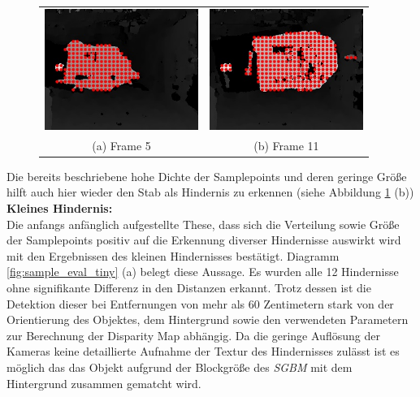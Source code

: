 \begin{figure}[h]
	\centering
	\begin{tabular}{cc}
	\includegraphics[width=5cm]{img/evaluation/sample_tiny_test_5_disparity}&
	\includegraphics[width=5cm]{img/evaluation/sample_tiny_test_11_disparity}\\
	(a) Frame 5 &  (b) Frame 11
	\end{tabular}
	\caption{}
	\label{fig:sample_eval_medium_fails}
\end{figure}

\noindent
Die bereits beschriebene hohe Dichte der Samplepoints und deren geringe Größe hilft auch hier wieder den Stab als Hindernis zu erkennen (siehe Abbildung \ref{fig:sample_eval_medium_fails} (b))\\


\noindent
\textbf{Kleines Hindernis:}\\
Die anfangs anfänglich aufgestellte These, dass sich die Verteilung sowie Größe der Samplepoints positiv auf die Erkennung diverser Hindernisse auswirkt wird mit den Ergebnissen des kleinen Hindernisses bestätigt. Diagramm \ref{fig:sample_eval_tiny} (a) belegt diese Aussage. Es wurden alle 12 Hindernisse ohne signifikante Differenz in den Distanzen erkannt. Trotz dessen ist die Detektion dieser bei Entfernungen von mehr als 60 Zentimetern stark von der Orientierung des Objektes, dem Hintergrund sowie den verwendeten Parametern zur Berechnung der Disparity Map abhängig. Da die geringe Auflösung der Kameras keine detaillierte Aufnahme der Textur des Hindernisses zulässt ist es möglich das das Objekt aufgrund der Blockgröße des \emph{SGBM} mit dem Hintergrund zusammen gematcht wird. 


